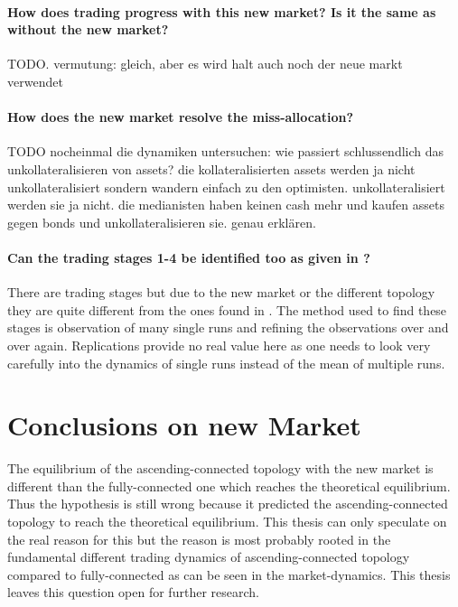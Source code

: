 \documentclass[Bachelorarbeit.tex]{subfiles}
\begin{document}
\paragraph{How does trading progress with this new market? Is it the same as without the new market?}
TODO. vermutung: gleich, aber es wird halt auch noch der neue markt verwendet

\paragraph{How does the new market resolve the miss-allocation?}
TODO nocheinmal die dynamiken untersuchen: wie passiert schlussendlich das unkollateralisieren von assets? die kollateralisierten assets werden ja nicht unkollateralisiert sondern wandern einfach zu den optimisten. unkollateralisiert werden sie ja nicht. die medianisten haben keinen cash mehr und kaufen assets gegen bonds und unkollateralisieren sie. genau erklären.

\paragraph{Can the trading stages 1-4 be identified too as given in \cite{Breuer_2015}?}
There are trading stages but due to the new market or the different topology they are quite different from the ones found in \cite{Breuer_2015}. The method used to find these stages is observation of many single runs and refining the observations over and over again. Replications provide no real value here as one needs to look very carefully into the dynamics of single runs instead of the mean of multiple runs.


\section{Conclusions on new Market}
The equilibrium of the ascending-connected topology with the new market is different than the fully-connected one which reaches the theoretical equilibrium. Thus the hypothesis is still wrong because it predicted the ascending-connected topology to reach the theoretical equilibrium. This thesis can only speculate on the real reason for this but the reason is most probably rooted in the fundamental different trading dynamics of ascending-connected topology compared to fully-connected as can be seen in the market-dynamics. This thesis leaves this question open for further research.
\end{document}
